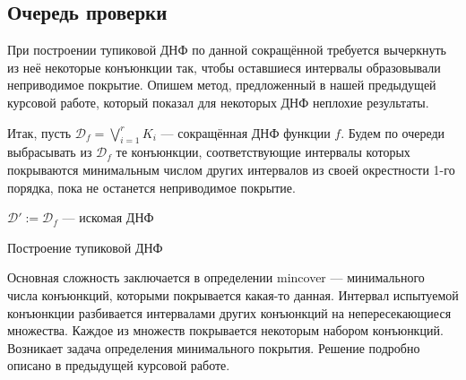 \documentclass[12pt,a4paper,oneside,fleqn,leqno]{article}
\theoremstyle{definition}
\begin{document}
		\subsection{Очередь проверки}
			При построении тупиковой ДНФ по данной сокращённой требуется вычеркнуть из неё некоторые конъюнкции так, чтобы оставшиеся интервалы образовывали неприводимое покрытие. Опишем метод, предложенный в нашей предыдущей курсовой работе, который показал для некоторых ДНФ неплохие результаты.\par
			Итак, пусть $\mathcal{D}_f = \bigvee\limits_{i = 1}^r K_i$ --- сокращённая ДНФ функции $f$. Будем по очереди выбрасывать из $\mathcal{D}_f$ те конъюнкции, соответствующие интервалы которых покрываются минимальным числом других интервалов из своей окрестности 1-го порядка, пока не останется неприводимое покрытие.\par
			\begin{algorithm}[H]
				\SetAlgoLined
				$\mathcal{D}' \mathbin{:=} \mathcal{D}_f$ --- искомая ДНФ\;	
			\caption{Построение тупиковой ДНФ}
			\label{get_irred}
		\end{algorithm}\par
		Основная сложность заключается в определении mincover --- минимального числа конъюнкций, которыми покрывается какая-то данная. Интервал испытуемой конъюнкции разбивается интервалами других конъюнкций на непересекающиеся множества. Каждое из множеств покрывается некоторым набором конъюнкций. Возникает задача определения минимального покрытия. Решение подробно описано в предыдущей курсовой работе.
	\newpage
\end{document}
